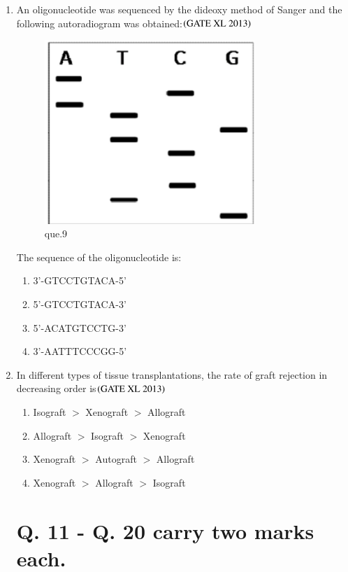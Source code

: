 \documentclass[journal]{IEEEtran}
\begin{document}
\begin{enumerate}
\item An oligonucleotide was sequenced by the dideoxy method of Sanger and the following autoradiogram was obtained:\hfill $\left(\text{GATE XL 2013}\right)$
\begin{figure}[H]
    \includegraphics[width=0.75\textwidth]{figs/Screenshot 2025-08-05 122205.png}
    \caption{que.9}
\end{figure}
The sequence of the oligonucleotide is:
\begin{enumerate}
    \item 3'-GTCCTGTACA-5'
    \item 5'-GTCCTGTACA-3'
    \item 5'-ACATGTCCTG-3'
    \item 3'-AATTTCCCGG-5'
\end{enumerate}

\item In different types of tissue transplantations, the rate of graft rejection in decreasing order is\hfill $\left(\text{GATE XL 2013}\right)$
\begin{enumerate}
    \item Isograft $>$ Xenograft $>$ Allograft
    \item Allograft $>$ Isograft $>$ Xenograft
    \item Xenograft $>$ Autograft $>$ Allograft
    \item Xenograft $>$ Allograft $>$ Isograft
\end{enumerate}

\section*{Q. 11 - Q. 20 carry two marks each.}


\end{enumerate}
\end{document}

